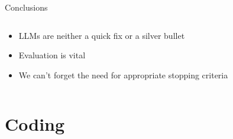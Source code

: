 \documentclass[9pt,aspectratio=169]{beamer}
\begin{document}
\begin{frame}{Conclusions}
	\begin{columns}
		\begin{column}{0.4\linewidth}
			\begin{itemize}
				\item<1-> LLMs are neither a quick fix or a silver bullet
				\item<2-> Evaluation is vital
				\item<3-> We can't forget the need for appropriate stopping criteria \cite{callaghan_statistical_2020}
			\end{itemize}
		\end{column}
		\begin{column}{0.6\linewidth}
			\begin{figure}
			\end{figure}
		\end{column}
	\end{columns}

\end{frame}

\section{Coding}
	
\end{document}
